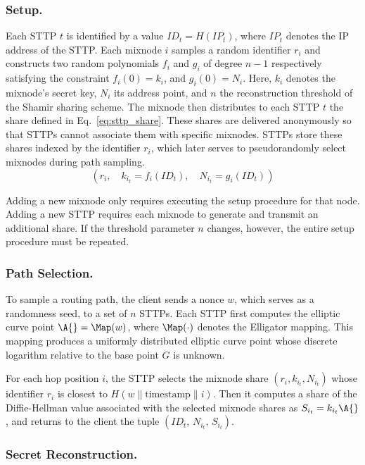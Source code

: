 \subsubsection{Setup.}
Each STTP $t$ is identified by a value $ID_t = H(IP_t)$, where $IP_t$ denotes the IP address of the STTP. 
Each mixnode $i$ samples a random identifier $r_i$ and constructs two random polynomials $f_i$ and $g_i$ of degree $n-1$ respectively satisfying the constraint $f_i(0) = k_i$, and $g_i(0) = N_i$. 
Here, $k_i$ denotes the mixnode's secret key, $N_i$ its address point, and $n$ the reconstruction threshold of the Shamir sharing scheme. The mixnode then distributes to each STTP $t$ the share defined in Eq.~\ref{eq:sttp_share}. 
These shares are delivered anonymously so that STTPs cannot associate them with specific mixnodes.
STTPs store these shares indexed by the identifier $r_i$, which later serves to pseudorandomly select mixnodes during path sampling.
\begin{equation}
    (r_i,\quad k_{i_t}=f_i(ID_t),\quad N_{i_t}=g_i(ID_t))
    \label{eq:sttp_share}
\end{equation}

Adding a new mixnode only requires executing the setup procedure for that node. Adding a new STTP requires each mixnode to generate and transmit an additional share. 
If the threshold parameter $n$ changes, however, the entire setup procedure must be repeated.

\subsubsection{Path Selection.}

To sample a routing path, the client sends a nonce $w$, which serves as a randomness seed, to a set of $n$ STTPs. Each STTP first computes the elliptic curve point $\A{} = \Map(w)$, where $\Map(\cdot)$ denotes the Elligator mapping. This mapping produces a uniformly distributed elliptic curve point whose discrete logarithm relative to the base point $G$ is unknown.

For each hop position $i$, the STTP selects the mixnode share $(r_i, k_{i_t}, N_{i_t})$ whose identifier $r_i$ is closest to $H(w \parallel \text{timestamp} \parallel i)$.
Then it computes a share of the Diffie-Hellman value associated with the selected mixnode shares as $S_{i_t} = k_{i_t} \A{}$,
and returns to the client the tuple $(ID_t,\, N_{i_t},\, S_{i_t})$.

\subsubsection{Secret Reconstruction.} 

